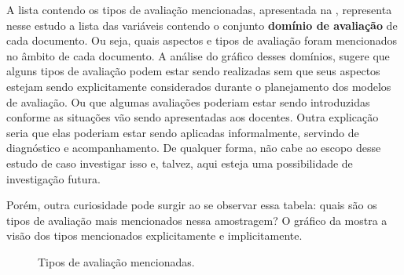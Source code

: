 A lista contendo os tipos de avaliação mencionadas, apresentada na , representa nesse estudo a lista das variáveis contendo o conjunto \textbf{domínio de avaliação} de cada documento. Ou seja, quais aspectos e tipos de avaliação foram mencionados no âmbito de cada documento. A análise do gráfico desses domínios, sugere que alguns tipos de avaliação podem estar sendo realizadas sem que seus aspectos estejam sendo explicitamente considerados durante o planejamento dos modelos de avaliação. Ou que algumas avaliações poderiam estar sendo introduzidas conforme as situações vão sendo apresentadas aos docentes. Outra explicação seria que elas poderiam estar sendo aplicadas informalmente, servindo de diagnóstico e acompanhamento. De qualquer forma, não cabe ao escopo desse estudo de caso investigar isso e, talvez, aqui esteja uma possibilidade de investigação futura.

 Porém, outra curiosidade pode surgir ao se observar essa tabela: quais são os tipos de avaliação mais mencionados nessa amostragem? O gráfico da  mostra a visão dos tipos mencionados explicitamente e implicitamente.

\begin{figure}[ht!]
    \centering
    \label{fig:t-aval-geral}
    \caption{Tipos de avaliação mencionadas.}
    \vspace{2mm}
\end{figure}

